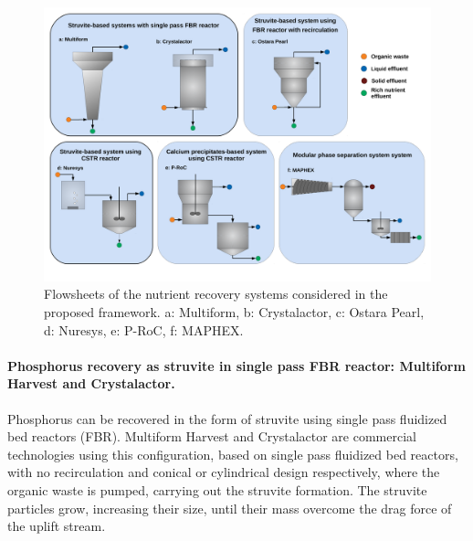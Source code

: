 \begin{refsection}[referencesCh4]
\begin{figure}[h!]
	\centering
	\includegraphics[width=1\linewidth, trim={0cm 2.5cm 0cm 0cm},clip]{gfx/AppendixC/diagrams} 
	\caption{Flowsheets of the nutrient recovery systems considered in the proposed framework. a: Multiform, b: Crystalactor, c: Ostara Pearl, d: Nuresys, e: P-RoC, f: MAPHEX.}
	\label{fig:techs_diagrams_AppC}
\end{figure}

\paragraph{Phosphorus recovery as struvite in single pass FBR reactor: Multiform Harvest and Crystalactor.}
Phosphorus can be recovered in the form of struvite using single pass fluidized bed reactors (FBR). Multiform Harvest and Crystalactor are commercial technologies using this configuration, based on single pass fluidized bed reactors, with no recirculation and conical or cylindrical design respectively, where the organic waste is pumped, carrying out the struvite formation. The struvite particles grow, increasing their size, until their mass overcome the drag force of the uplift stream.


\end{refsection}
